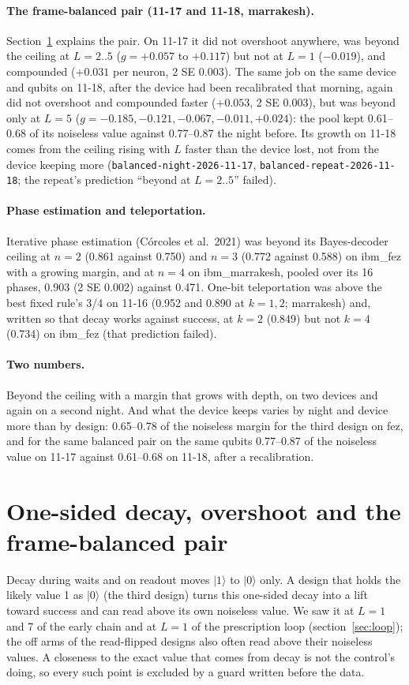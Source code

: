 \documentclass[10pt,a4paper]{article}
\begin{document}
\paragraph{The frame-balanced pair (11-17 and 11-18, marrakesh).} Section~\ref{sec:decay} explains the pair. On 11-17 it
did not overshoot anywhere, was beyond the ceiling at $L = 2..5$ ($g = +0.057$ to $+0.117$) but not at $L = 1$
($-0.019$), and compounded ($+0.031$ per neuron, 2 SE 0.003). The same job on the same device and qubits on 11-18, after
the device had been recalibrated that morning, again did not overshoot and compounded faster ($+0.053$, 2 SE 0.003),
but was beyond only at $L = 5$ ($g = -0.185, -0.121, -0.067, -0.011, +0.024$): the pool kept 0.61--0.68 of its noiseless
value against 0.77--0.87 the night before. Its growth on 11-18 comes from the ceiling rising with $L$ faster than the
device lost, not from the device keeping more (\texttt{balanced-night-2026-11-17}, \texttt{balanced-repeat-2026-11-18};
the repeat's prediction ``beyond at $L = 2..5$'' failed).

\paragraph{Phase estimation and teleportation.} Iterative phase estimation (C\'orcoles et al.\ 2021) was beyond its
Bayes-decoder ceiling at $n = 2$ (0.861 against 0.750) and $n = 3$ (0.772 against 0.588) on ibm\_fez with a growing
margin, and at $n = 4$ on ibm\_marrakesh, pooled over its 16 phases, 0.903 (2 SE 0.002) against 0.471. One-bit
teleportation was above the best fixed rule's 3/4 on 11-16 (0.952 and 0.890 at $k = 1, 2$; marrakesh) and, written so
that decay works against success, at $k = 2$ (0.849) but not $k = 4$ (0.734) on ibm\_fez (that prediction failed).

\paragraph{Two numbers.} Beyond the ceiling with a margin that grows with depth, on two devices and again on a second
night. And what the device keeps varies by night and device more than by design: 0.65--0.78 of the noiseless margin for
the third design on fez, and for the same balanced pair on the same qubits 0.77--0.87 of the noiseless value on 11-17
against 0.61--0.68 on 11-18, after a recalibration.

\section{One-sided decay, overshoot and the frame-balanced pair}\label{sec:decay}
Decay during waits and on readout moves $|1\rangle$ to $|0\rangle$ only. A design that holds the likely value 1 as
$|0\rangle$ (the third design) turns this one-sided decay into a lift toward success and can read above its own
noiseless value. We saw it at $L = 1$ and 7 of the early chain and at $L = 1$ of the prescription loop
(section~\ref{sec:loop}); the off arms of the read-flipped designs also often read above their noiseless values. A
closeness to the exact value that comes from decay is not the control's doing, so every such point is excluded by a
guard written before the data.
\end{document}
